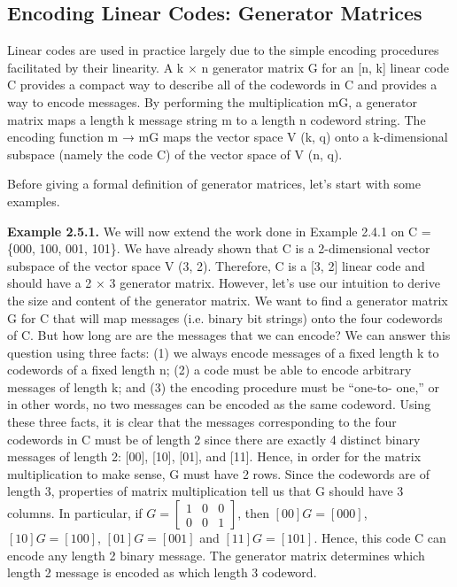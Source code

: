 \documentclass{article}
\begin{document}
\subsection{Encoding Linear Codes: Generator Matrices}
Linear codes are used in practice largely due to the simple encoding procedures facilitated by their
linearity. A k × n generator matrix G for an [n, k] linear code C provides a compact way to describe
all of the codewords in C and provides a way to encode messages. By performing the multiplication
mG, a generator matrix maps a length k message string m to a length n codeword string. The
encoding function m → mG maps the vector space V (k, q) onto a k-dimensional subspace (namely
the code C) of the vector space of V (n, q).

Before giving a formal definition of generator matrices, let’s start with some examples.

\textbf{Example 2.5.1.} We will now extend the work done in Example 2.4.1 on C = \{000, 100, 001, 101\}.
We have already shown that C is a 2-dimensional vector subspace of the vector space V (3, 2).
Therefore, C is a [3, 2] linear code and should have a 2 × 3 generator matrix. However, let’s use
our intuition to derive the size and content of the generator matrix. We want to find a generator
matrix G for C that will map messages (i.e. binary bit strings) onto the four codewords of C. But
how long are are the messages that we can encode? We can answer this question using three facts:
(1) we always encode messages of a fixed length k to codewords of a fixed length n; (2) a code must
be able to encode arbitrary messages of length k; and (3) the encoding procedure must be “one-to-
one,” or in other words, no two messages can be encoded as the same codeword. Using these three
facts, it is clear that the messages corresponding to the four codewords in C must be of length 2
since there are exactly 4 distinct binary messages of length 2: [00], [10], [01], and [11]. Hence, in
order for the matrix multiplication to make sense, G must have 2 rows. Since the codewords are of length 3, 
properties of matrix multiplication tell us that G should have 3 columns. In particular, if 
$ G =
\begin{bmatrix}
1 & 0 & 0\\
0 & 0 & 1
\end{bmatrix}
$, then
$[00]G=[000]$, $[10]G=[100]$, $[01]G=[001]$ and $[11]G=[101]$. 
Hence, this code C can encode any length 2 binary message. The generator matrix determines which length 2 message is encoded as which length 3 codeword.
\end{document}
